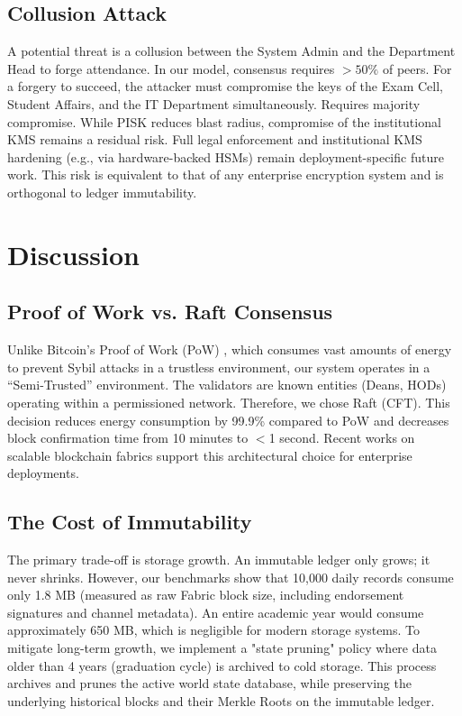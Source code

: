 \documentclass[conference]{IEEEtran}
\begin{document}
\subsection{Collusion Attack}
A potential threat is a collusion between the System Admin and the Department Head to forge attendance. In our model, consensus requires $>50\%$ of peers. For a forgery to succeed, the attacker must compromise the keys of the Exam Cell, Student Affairs, and the IT Department simultaneously. Requires majority compromise.
While PISK reduces blast radius, compromise of the institutional KMS remains a residual risk. Full legal enforcement and institutional KMS hardening (e.g., via hardware-backed HSMs) remain deployment-specific future work. This risk is equivalent to that of any enterprise encryption system and is orthogonal to ledger immutability.

\section{Discussion}

\subsection{Proof of Work vs. Raft Consensus}
Unlike Bitcoin's Proof of Work (PoW) \cite{b17}, which consumes vast amounts of energy to prevent Sybil attacks in a trustless environment, our system operates in a ``Semi-Trusted'' environment. The validators are known entities (Deans, HODs) operating within a permissioned network. Therefore, we chose Raft (CFT). This decision reduces energy consumption by 99.9\% compared to PoW and decreases block confirmation time from 10 minutes to $<$1 second. Recent works on scalable blockchain fabrics \cite{b18} support this architectural choice for enterprise deployments.

\subsection{The Cost of Immutability}
The primary trade-off is storage growth. An immutable ledger only grows; it never shrinks. However, our benchmarks show that 10,000 daily records consume only 1.8 MB (measured as raw Fabric block size, including endorsement signatures and channel metadata). An entire academic year would consume approximately 650 MB, which is negligible for modern storage systems. To mitigate long-term growth, we implement a "state pruning" policy where data older than 4 years (graduation cycle) is archived to cold storage. This process archives and prunes the active world state database, while preserving the underlying historical blocks and their Merkle Roots on the immutable ledger.
\end{document}
